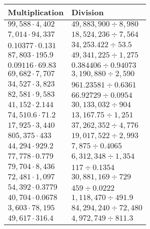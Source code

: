 \begin{longtable}[]{@{}ll@{}}
\toprule
Multiplication & Division\tabularnewline
\midrule
\endhead
\(99,588\cdot4,402\) & \(49,883,900÷8,980\)\tabularnewline
\(7,014\cdot94,337\) & \(18,524,236÷7,564\)\tabularnewline
\(0.10377\cdot 0.131\) & \(34,253.422÷53.5\)\tabularnewline
\(87,803\cdot195.9\) & \(49,341,225÷1,275\)\tabularnewline
\(0.09116\cdot69.83\) & \(0.384406÷0.94073\)\tabularnewline
\(69,682\cdot7,707\) & \(3,190,880÷2,590\)\tabularnewline
\(34,527\cdot3,823\) & \(961.23581÷0.6361\)\tabularnewline
\(82,581\cdot9,583\) & \(66.92729÷0.0954\)\tabularnewline
\(41,152\cdot2.144\) & \(30,133,032÷904\)\tabularnewline
\(74,510.6\cdot71.2\) & \(13,167.75÷1,251\)\tabularnewline
\(17,925\cdot3,440\) & \(37,262,352÷4,776\)\tabularnewline
\(805,375\cdot433\) & \(19,017,522÷2,993\)\tabularnewline
\(44,294\cdot929.2\) & \(7,875÷0.4065\)\tabularnewline
\(77,778\cdot 0.779\) & \(6,312,348÷1,354\)\tabularnewline
\(79,704\cdot8,436\) & \(117÷0.1354\)\tabularnewline
\(72,481\cdot1,097\) & \(30,881,169÷729\)\tabularnewline
\(54,392\cdot0.3779\) & \(459÷0.0222\)\tabularnewline
\(40,704\cdot0.0678\) & \(1,118,470 ÷491.9\)\tabularnewline
\(3,603\cdot78,195\) & \(84,294,240÷72,480\)\tabularnewline
\(49,617\cdot316.4\) & \(4,972,749÷811.3\)\tabularnewline
\bottomrule
\end{longtable}
